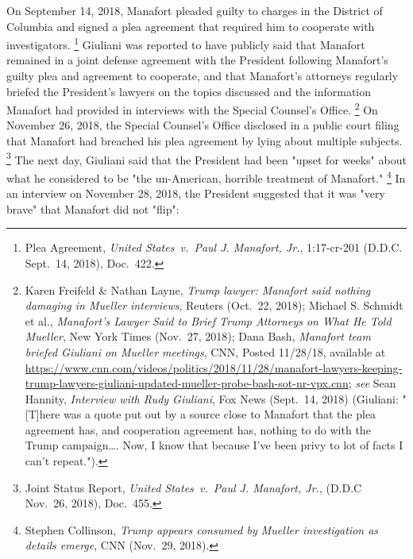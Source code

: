 {On September 14, 2018, Manafort pleaded guilty to charges in the District of Columbia and signed a plea agreement that required him to cooperate with investigators.%
\footnote{Plea Agreement, \textit{United States~v.\ Paul J. Manafort, Jr.}, 1:17-cr-201 (D.D.C. Sept.~14, 2018), Doc.~422.}
Giuliani was reported to have publicly said that Manafort remained in a joint defense agreement with the President following Manafort's guilty plea and agreement to cooperate, and that Manafort's attorneys regularly briefed the President's lawyers on the topics discussed and the information Manafort had provided in interviews with the Special Counsel's Office.%
\footnote{Karen Freifeld \& Nathan Layne, \textit{Trump lawyer: Manafort said nothing damaging in Mueller interviews}, Reuters (Oct.~22, 2018);
Michael S. Schmidt et al., \textit{Manafort's Lawyer Said to Brief Trump Attorneys on What He Told Mueller}, New York Times (Nov.~27, 2018);
Dana Bash, \textit{Manafort team briefed Giuliani on Mueller meetings}, CNN, Posted 11/28/18, available at
\url{https://www.cnn.com/videos/politics/2018/11/28/manafort-lawyers-keeping-trump-lawyers-giuliani-updated-mueller-probe-bash-sot-nr-vpx.cnn};
\textit{see} Sean Hannity, \textit{Interview with Rudy Giuliani}, Fox News (Sept.~14, 2018) (Giuliani: "[T]here was a quote put out by a source close to Manafort that the plea agreement has, and cooperation agreement has, nothing to do with the Trump campaign\dots.
Now, I know that because I've been privy to lot of facts I can't repeat.").}
On November 26, 2018, the Special Counsel's Office disclosed in a public court filing that Manafort had breached his plea agreement by lying about multiple subjects.%
\footnote{Joint Status Report, \textit{United States~v.\ Paul J. Manafort, Jr.}, (D.D.C Nov.~26, 2018), Doc.~455.}
The next day, Giuliani said that the President had been "upset for weeks" about what he considered to be "the un-American, horrible treatment of Manafort."%
\footnote{Stephen Collinson, \textit{Trump appears consumed by Mueller investigation as details emerge}, CNN (Nov.~29, 2018).}
In an interview on November 28, 2018, the President suggested that it was "very brave" that Manafort did not "flip":

}
